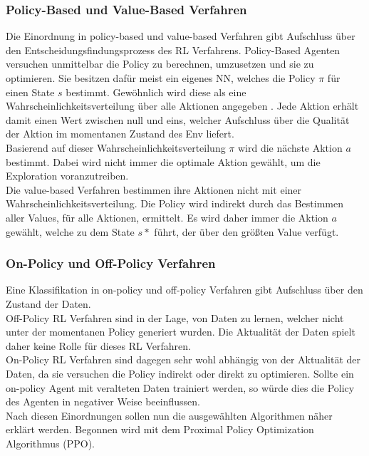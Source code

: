 \subsubsection{Policy-Based und Value-Based Verfahren} \label{subsubsec:Grundlagen_policy_value_based}
Die Einordnung in policy-based und value-based Verfahren gibt Aufschluss über den Entscheidungsfindungsprozess des RL Verfahrens.
Policy-Based Agenten versuchen unmittelbar die Policy zu berechnen, umzusetzen und sie zu optimieren. Sie besitzen dafür meist ein eigenes NN, welches die Policy $\pi$ für einen State $s$ bestimmt.
Gewöhnlich wird diese als eine Wahrscheinlichkeitsverteilung über alle Aktionen angegeben . Jede Aktion erhält damit einen Wert zwischen null und eins, welcher Aufschluss über die Qualität der Aktion im momentanen Zustand des Env liefert. \citep[S. 100]{DRL_Lapan} \\
Basierend auf dieser Wahrscheinlichkeitsverteilung $\pi$ wird die nächste Aktion $a$ bestimmt. Dabei wird nicht immer die optimale Aktion gewählt, um die Exploration voranzutreiben.\\
Die value-based Verfahren bestimmen ihre Aktionen nicht mit einer Wahrscheinlichkeitsverteilung. Die Policy wird indirekt durch das Bestimmen aller Values,  für alle Aktionen, ermittelt. Es wird daher immer die Aktion $a$ gewählt, welche zu dem State $s*$ führt, der über den größten Value verfügt. \citep[S. 100]{DRL_Lapan}

\subsubsection{On-Policy und Off-Policy Verfahren} \label{subsubsec:Grundlagen_on_off_policy}
Eine Klassifikation in on-policy und off-policy Verfahren gibt Aufschluss über den Zustand der Daten.\\ 
Off-Policy RL Verfahren sind in der Lage, von Daten zu lernen, welcher nicht unter der momentanen Policy  generiert wurden. Die Aktualität der Daten spielt daher keine Rolle für dieses RL Verfahren.\\
On-Policy RL Verfahren sind dagegen sehr wohl abhängig von der Aktualität der Daten, da sie versuchen die Policy indirekt oder direkt zu optimieren. Sollte ein on-policy Agent mit veralteten Daten trainiert werden, so würde dies die Policy des Agenten in negativer Weise beeinflussen. \citep[S. 210 f.]{DRL_Lapan}\\
Nach diesen Einordnungen sollen nun die ausgewählten Algorithmen näher erklärt werden. Begonnen wird mit dem Proximal Policy Optimization Algorithmus (PPO).

